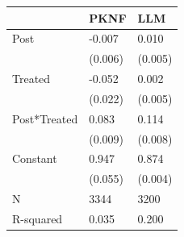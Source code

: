 \begin{tabular}{lll}
\toprule
 & PKNF & LLM \\
\midrule
Post & -0.007 & 0.010 \\
 & (0.006) & (0.005) \\
Treated & -0.052 & 0.002 \\
 & (0.022) & (0.005) \\
Post*Treated & 0.083 & 0.114 \\
 & (0.009) & (0.008) \\
Constant & 0.947 & 0.874 \\
 & (0.055) & (0.004) \\
N & 3344 & 3200 \\
R-squared & 0.035 & 0.200 \\
\bottomrule
\end{tabular}
